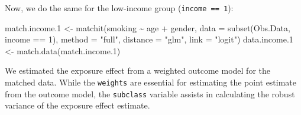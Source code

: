 \documentclass[
  letterpaper,
  DIV=11,
  numbers=noendperiod]{scrreprt}
\newenvironment{Shaded}{\begin{snugshade}}{\end{snugshade}}
\newcommand{\AttributeTok}[1]{\textcolor[rgb]{0.40,0.45,0.13}{#1}}
\newcommand{\DecValTok}[1]{\textcolor[rgb]{0.68,0.00,0.00}{#1}}
\newcommand{\FloatTok}[1]{\textcolor[rgb]{0.68,0.00,0.00}{#1}}
\newcommand{\FunctionTok}[1]{\textcolor[rgb]{0.28,0.35,0.67}{#1}}
\newcommand{\NormalTok}[1]{\textcolor[rgb]{0.00,0.23,0.31}{#1}}
\newcommand{\OtherTok}[1]{\textcolor[rgb]{0.00,0.23,0.31}{#1}}
\newcommand{\SpecialCharTok}[1]{\textcolor[rgb]{0.37,0.37,0.37}{#1}}
\newcommand{\StringTok}[1]{\textcolor[rgb]{0.13,0.47,0.30}{#1}}
\begin{document}
Now, we do the same for the low-income group (\texttt{income\ ==\ 1}):

\begin{Shaded}
\begin{Highlighting}[]
\NormalTok{match.income}\FloatTok{.1} \OtherTok{\textless{}{-}} \FunctionTok{matchit}\NormalTok{(smoking }\SpecialCharTok{\textasciitilde{}}\NormalTok{ age }\SpecialCharTok{+}\NormalTok{ gender, }
                          \AttributeTok{data =} \FunctionTok{subset}\NormalTok{(Obs.Data, income }\SpecialCharTok{==} \DecValTok{1}\NormalTok{),}
                          \AttributeTok{method =} \StringTok{"full"}\NormalTok{, }\AttributeTok{distance =} \StringTok{"glm"}\NormalTok{, }\AttributeTok{link =} \StringTok{"logit"}\NormalTok{)}
\NormalTok{data.income}\FloatTok{.1} \OtherTok{\textless{}{-}} \FunctionTok{match.data}\NormalTok{(match.income}\FloatTok{.1}\NormalTok{)}
\end{Highlighting}
\end{Shaded}

We estimated the exposure effect from a weighted outcome model for the
matched data. While the \texttt{weights} are essential for estimating
the point estimate from the outcome model, the \texttt{subclass}
variable assists in calculating the robust variance of the exposure
effect estimate.
\end{document}
